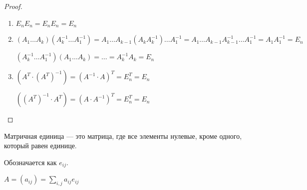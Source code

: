 \begin{proof}
    \begin{enumerate}
        \item $E_n E_n = E_n E_n = E_n$
        
        \item $(A_1 \ldots A_k)(A_k^{-1} \ldots A_1^{-1}) = A_1 \ldots A_{k-1} (A_k A_k^{-1}) \ldots A_1^{-1} = A_1 \ldots A_{k - 1} A_{k - 1}^{-1} \ldots A_1^{-1} = A_1 A_1^{-1} = E_n$
        
        $(A_k^{-1} \ldots A_1^{-1})(A_1 \ldots A_k) = \ldots = A_k^{-1} A_k = E_n$

        \item $(A^T \cdot (A^T)^{-1}) = (A^{-1} \cdot A)^T = E_n^T = E_n$
        
        $((A^T)^{-1} \cdot A^T) = (A \cdot A^{-1})^T = E_n^T = E_n$
    \end{enumerate}
\end{proof}

\begin{defn}
    Матричная единица --- это матрица, где все элементы нулевые, кроме одного, который равен единице.

    Обозначается как $e_{ij}$.
\end{defn}

\begin{notice}
    $A = (a_{ij}) = \sum\limits_{i, j} a_{ij} e_{ij}$
\end{notice}